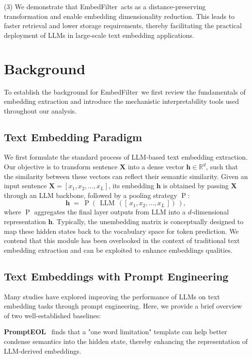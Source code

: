 \documentclass{llmxive}
\providecommand{\bm}[1]{\boldsymbol{#1}}
\providecommand{\name}{EmbedFilter}
\providecommand{\vh}{{\bm{h}}}
\providecommand{\mX}{{\bm{X}}}
\begin{document}
(3) We demonstrate that \name\ acts as a distance-preserving transformation and enable embedding dimensionality reduction. 
This leads to faster retrieval and lower storage requirements, thereby facilitating the practical deployment of LLMs in large-scale text embedding applications.

\section{Background}
\label{sec:bg}
To establish the background for \name\, we first review the fundamentals of embedding extraction and introduce the mechanistic interpretability tools used throughout our analysis.

\subsection{Text Embedding Paradigm}
We first formulate the standard process of LLM-based text embedding extraction. 
Our objective is to transform sentence \(\mX\) into a dense vector \( \vh \in \mathbb{R}^d\), such that the similarity between these vectors can reflect their semantic similarity.
Given an input sentence \(\mX=\left[x_1,x_2,\dots,x_L\right]\), its embedding \( \vh \) is obtained by passing \(\mX\) through an LLM backbone, followed by a pooling strategy \(\operatorname{P}\):
{\Large \[
\vh \; = \; \operatorname{P} \left (\,\operatorname{LLM}\,(\left[\,x_1,x_2,\dots,x_L\,\right]) \,\right),
\]}
where \( \operatorname{P} \) aggregates the final layer outputs from \(\textrm{LLM}\) into a \(d\)-dimensional representation \( \vh \).
Typically, the unembedding matrix is conceptually designed to map these hidden states back to the vocabulary space for token prediction.
We contend that this module has been overlooked in the context of traditional text embedding extraction and can be exploited to enhance embeddings qualities.

\subsection{Text Embeddings with Prompt Engineering}

Many studies have explored improving the performance of LLMs on text embedding tasks through prompt engineering. 
Here, we provide a brief overview of two well-established baselines:

\textbf{PromptEOL}~\cite{prompteol} finds that a "one word limitation" template can help better condense semantics into the hidden state, thereby enhancing the representation of LLM-derived embeddings.
\end{document}
